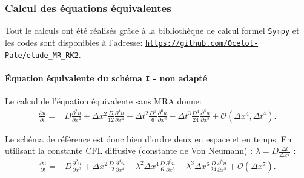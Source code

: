 \subsubsection{Calcul des équations équivalentes}
Tout le calculs ont été réalisés grâce à la bibliothèque de calcul formel \texttt{Sympy} et les codes 
sont disponibles à l'adresse: \href{https://github.com/Ocelot-Pale/etude_MR_RK2}{\nolinkurl{https://github.com/Ocelot-Pale/etude_MR_RK2}}.
\paragraph{Équation équivalente du schéma \texttt{I} - non adapté}
    Le calcul de l'équation équivalente sans MRA donne:
    \begin{align}
        \frac{\partial u}{\partial t}  =&D \frac{\partial^{2}u}{\partial x^{2}}
        + \Delta x^{2} \frac{D}{12}             \frac{\partial^{4}u}{\partial x^{4}} 
        -  \Delta t^{2} \frac{D^{3}}{6}          \frac{\partial^{6}u}{\partial x^{6}} 
        -  \Delta t^{3} \frac{D^{4}}{24}        \frac{\partial^{8}u}{\partial x^{8}}  + \mathcal{O}(\Delta x^4 , \Delta t^4).
    \end{align}
    
    Le schéma de référence est donc bien d'ordre deux en espace et en temps.
    En utilisant la constante CFL diffusive (constante de Von Neumann) : $\lambda = D \frac{\Delta t}{\Delta x^2}$ : 
    \begin{align}\label{eq:ref:cfl}
        \frac{\partial u}{\partial t}  =&D \frac{\partial^{2}u}{\partial x^{2}}
        + \Delta x^{2} \frac{D}{12}             \frac{\partial^{4}u}{\partial x^{4}} 
        - \lambda^2 \Delta  x^{4} \frac{D}{6}          \frac{\partial^{6}u}{\partial x^{6}} 
        - \lambda^3 \Delta x^{6} \frac{D}{24}        \frac{\partial^{8}u}{\partial x^{8}}  + \mathcal{O}(\Delta x^7).
    \end{align}
